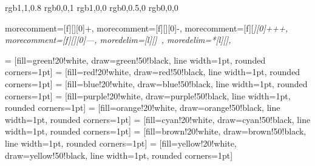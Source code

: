 
\setlength{\parindent}{0pt}
\setlength{\parskip}{0.9ex plus 0.5ex minus 0.2ex}


\usepackage{listings}         %
\usepackage{color}            %
\definecolor{colBg}        {rgb}{1,1,0.8}
\definecolor{colKeys}      {rgb}{0,0,1}
\definecolor{colComments}  {rgb}{1,0,0}
\definecolor{colString}    {rgb}{0,0.5,0}
\definecolor{colBasic}     {rgb}{0,0,0}
\lstset{language=C++}        %

 {
    morecomment=[f][\color{darkgreen}][0]{+},
    morecomment=[f][\color{red}][0]{-},
    morecomment=[f][\itshape\color{darkgreen2}][0]{+++},
    morecomment=[f][\itshape\color{red2}][0]{---},
    moredelim=[l][\color{cyan}]{\ \@\@},
    moredelim=*[l][\color{blue}]{\@\@},
}

\hypersetup{colorlinks=true,plainpages=false,urlcolor=blue}


  = [fill=green!20!white,  draw=green!50!black,  line width=1pt, rounded corners=1pt]
    = [fill=red!20!white,    draw=red!50!black,    line width=1pt, rounded corners=1pt]
   = [fill=blue!20!white,   draw=blue!50!black,   line width=1pt, rounded corners=1pt]
 = [fill=purple!20!white, draw=purple!50!black, line width=1pt, rounded corners=1pt]
 = [fill=orange!20!white, draw=orange!50!black, line width=1pt, rounded corners=1pt]
   = [fill=cyan!20!white,   draw=cyan!50!black,   line width=1pt, rounded corners=1pt]
  = [fill=brown!20!white,  draw=brown!50!black,  line width=1pt, rounded corners=1pt]
 = [fill=yellow!20!white, draw=yellow!50!black, line width=1pt, rounded corners=1pt]

